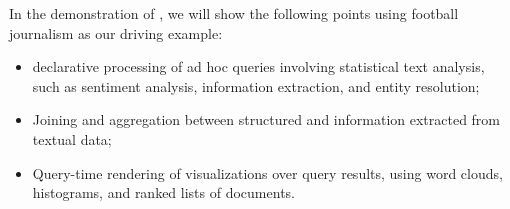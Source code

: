 
In the demonstration of \system, we will show the 
following points using football journalism as our driving example:
\begin{itemize}
\item declarative processing of ad hoc queries 
involving statistical text analysis, such as sentiment analysis,
information extraction, and entity resolution;
\item Joining and aggregation between structured and information extracted
from textual data;
\item Query-time rendering of visualizations over query results, using 
word clouds, histograms, and ranked lists of documents.
\end{itemize}


